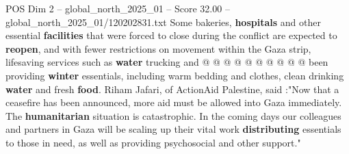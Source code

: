 \begin{textsample}{POS Dim 2 – global\_north\_2025\_01 – Score 32.00 – global\_north\_2025\_01/120202831.txt}
Some bakeries, \textbf{hospitals} and other essential \textbf{facilities} that were forced to close during the conflict are expected to \textbf{reopen}, and with fewer restrictions on movement within the Gaza strip, lifesaving services such as \textbf{water} trucking and @ @ @ @ @ @ @ @ @ @ been providing \textbf{winter} essentials, including warm bedding and clothes, clean drinking \textbf{water} and fresh \textbf{food}.
Riham Jafari, of ActionAid Palestine, said :"Now that a ceasefire has been announced, more aid must be allowed into Gaza immediately.
The \textbf{humanitarian} situation is catastrophic.
In the coming days our colleagues and partners in Gaza will be scaling up their vital work \textbf{distributing} essentials to those in need, as well as providing psychosocial and other support."

\end{textsample}
